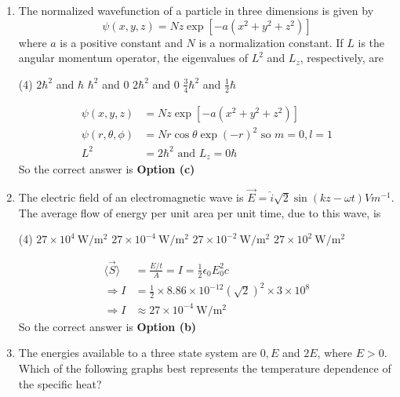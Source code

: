 \begin{enumerate}
\begin{answer}
\end{answer}
\item The normalized wavefunction of a particle in three dimensions is given by
$$
\psi(x, y, z)=N z \exp \left[-a\left(x^{2}+y^{2}+z^{2}\right)\right]
$$
where $a$ is a positive constant and $N$ is a normalization constant. If $L$ is the angular momentum operator, the eigenvalues of $L^{2}$ and $L_{z}$, respectively, are
 \begin{tasks}(4)
	\task[\textbf{a.}]$2 \hbar^{2}$ and $\hbar$
	\task[\textbf{b.}]$\hbar^{2}$ and 0
	\task[\textbf{c.}] $2 \hbar^{2}$ and 0
	\task[\textbf{d.}] $\frac{3}{4} \hbar^{2}$ and $\frac{1}{2} \hbar$
\end{tasks}
\begin{answer}
	\begin{align*}
	\psi(x, y, z)&=N z \exp \left[-a\left(x^{2}+y^{2}+z^{2}\right)\right]\\
	\psi(r, \theta, \phi)&=N r \cos \theta \exp (-r)^{2} \text { so } m=0, l=1\\
	L^{2}&=2 \hbar^{2} \text { and } L_{z}=0 \hbar
	\end{align*}
		So the correct answer is \textbf{Option (c)}
\end{answer}
\item The electric field of an electromagnetic wave is $\vec{E}=\hat{i} \sqrt{2} \sin (k z-\omega t) V m^{-1}$. The average flow of energy per unit area per unit time, due to this wave, is
 \begin{tasks}(4)
	\task[\textbf{a.}]$27 \times 10^{4} \mathrm{~W} / \mathrm{m}^{2}$
	\task[\textbf{b.}]$27 \times 10^{-4} \mathrm{~W} / \mathrm{m}^{2}$
	\task[\textbf{c.}]$27 \times 10^{-2} \mathrm{~W} / \mathrm{m}^{2}$
	\task[\textbf{d.}] $27 \times 10^{2} \mathrm{~W} / \mathrm{m}^{2}$
\end{tasks}
\begin{answer}
	\begin{align*}
	\langle\vec{S}\rangle&=\frac{E / t}{A}=I=\frac{1}{2} \epsilon_{0} E_{0}^{2} c\\
	\Rightarrow I&=\frac{1}{2} \times 8.86 \times 10^{-12}(\sqrt{2})^{2} \times 3 \times 10^{8}\\
	\Rightarrow I &\approx 27 \times 10^{-4} \mathrm{~W} / \mathrm{m}^{2}
	\end{align*}
		So the correct answer is \textbf{Option (b)}
\end{answer}
\item The energies available to a three state system are $0, E$ and $2 E$, where $E>0$. Which of the following graphs best represents the temperature dependence of the specific heat?

\end{enumerate}
